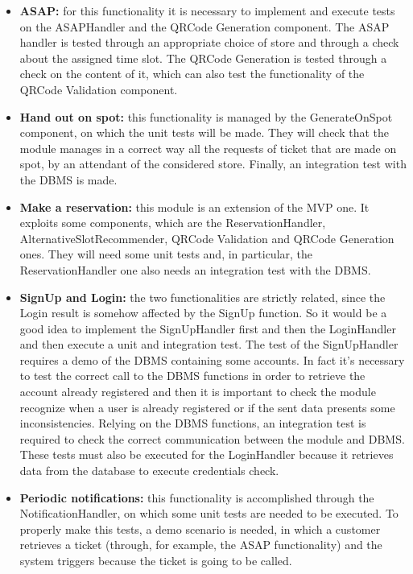 \documentclass[table, 12pt]{article}
\begin{document}
\begin{itemize}
    \item \textbf{ASAP:} for this functionality it is necessary to implement and execute tests on the ASAPHandler and the QRCode Generation component. The ASAP handler is tested through an appropriate choice of store and through a check about the assigned time slot. The QRCode Generation is tested through a check on the content of it, which can also test the functionality of the QRCode Validation component.
    \item \textbf{Hand out on spot:} this functionality is managed by the GenerateOnSpot component, on which the unit tests will be made. They will check that the module manages in a correct way all the requests of ticket that are made on spot, by an attendant of the considered store. Finally, an integration test with the DBMS is made.
    \item \textbf{Make a reservation:} this module is an extension of the MVP one. It exploits some components, which are the ReservationHandler, AlternativeSlotRecommender, QRCode Validation and QRCode Generation ones. They will need some unit tests and, in particular, the ReservationHandler one also needs an integration test with the DBMS.
    \item \textbf{SignUp and Login:} the two functionalities are strictly related, since the Login result is somehow affected by the SignUp function. So it would be a good idea to implement the SignUpHandler first and then the LoginHandler and then execute a unit and integration test. The test of the SignUpHandler requires a demo of the DBMS containing some accounts. In fact it’s necessary to test the correct call to the DBMS functions in order to retrieve the account already registered and then it is important to check the module recognize when a user is already registered or if the sent data presents some inconsistencies. Relying on the DBMS functions, an integration test is required to check the correct communication between the module and DBMS. These tests must also be executed for the LoginHandler because it retrieves data from the database to execute credentials check.
    \item \textbf{Periodic notifications:} this functionality is accomplished through the NotificationHandler, on which some unit tests are needed to be executed. To properly make this tests, a demo scenario is needed, in which a customer retrieves a ticket (through, for example, the ASAP functionality) and the system triggers because the ticket is going to be called.
\end{itemize}
\end{document}

